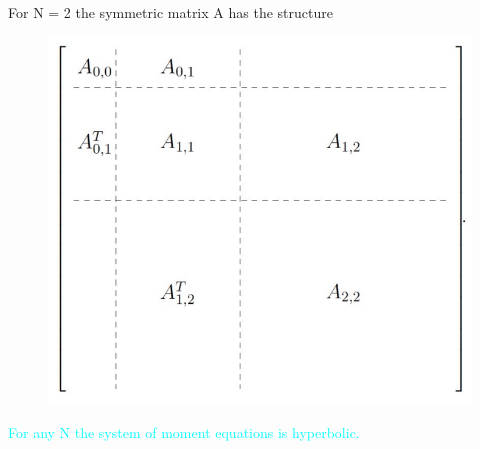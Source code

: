 \begin{frame}
	\scriptsize
	For N = 2 the symmetric matrix A has the structure
\begin{figure}[H]
	\includegraphics[scale=0.5]{Bilder/MatrixAN=2}
\end{figure}
\textcolor{cyan}{For any N the system of moment equations is hyperbolic.}
\end{frame}

